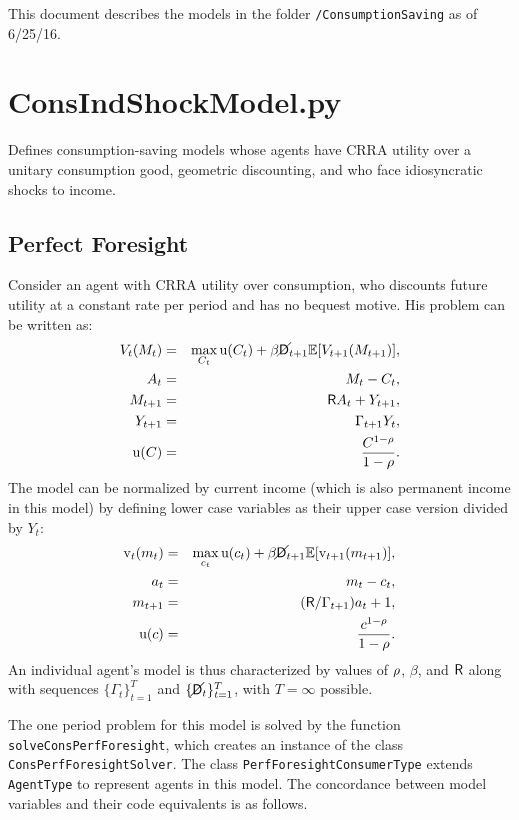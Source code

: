 \documentclass[12pt,titlepage,letterpaper]{econtex}
\newcommand{\E}{\mathbb{E}}
\begin{document}
\noindent This document describes the models in the folder \texttt{/ConsumptionSaving} as of 6/25/16.

\section{ConsIndShockModel.py}

Defines consumption-saving models whose agents have CRRA utility over a unitary consumption good, geometric discounting, and who face idiosyncratic shocks to income.

\subsection{Perfect Foresight}

Consider an agent with CRRA utility over consumption, who discounts future utility at a constant rate per period and has no bequest motive.  His problem can be written as:
\begin{eqnarray*}
V_t(M_t) &=& \max_{C_t} \utilFunc(C_t) + \beta \PLives_{t+1} \E [V_{t+1}(M_{t+1}) ], \\
A_t &=& M_t - C_t, \\
M_{t+1} &=& \Rfree A_t + Y_{t+1}, \\
Y_{t+1} &=& \Gamma_{t+1} Y_t, \\
\utilFunc(C) &=& \frac{C^{1-\CRRA}}{1-\CRRA}.
\end{eqnarray*}
The model can be normalized by current income (which is also permanent income in this model) by defining lower case variables as their upper case version divided by $Y_t$:
\begin{eqnarray*}
\vFunc_t(m_t) &=& \max_{c_t} \utilFunc(c_t) + \beta \PLives_{t+1} \E [\vFunc_{t+1}(m_{t+1}) ], \\
a_t &=& m_t - c_t, \\
m_{t+1} &=& (\Rfree/\Gamma_{t+1}) a_t + 1, \\
\utilFunc(c) &=& \frac{c^{1-\CRRA}}{1-\CRRA}.
\end{eqnarray*}
An individual agent's model is thus characterized by values of $\rho$, $\beta$, and $\mathsf{R}$ along with sequences $\{\Gamma_t\}_{t=1}^T$ and $\{\cancel{\mathsf{D}}_t\}_{t=1}^T$, with $T = \infty$ possible.

The one period problem for this model is solved by the function \texttt{solveConsPerfForesight}, which creates an instance of the class \texttt{ConsPerfForesightSolver}.  The class \texttt{PerfForesightConsumerType} extends \texttt{AgentType} to represent agents in this model. The concordance between model variables and their code equivalents is as follows.
\end{document}
